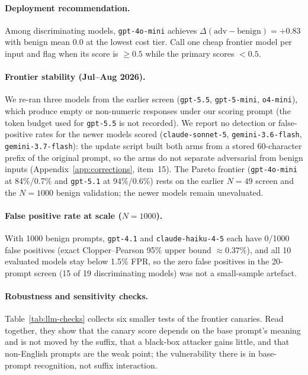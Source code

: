 \documentclass{article}
\begin{document}
\paragraph{Deployment recommendation.} Among discriminating models, \texttt{gpt-4o-mini} achieves $\Delta(\text{adv} - \text{benign}) = +0.83$ with benign mean $0.0$ at the lowest cost tier. Call one cheap frontier model per input and flag when its score is $\geq 0.5$ while the primary scores $< 0.5$.

\paragraph{Frontier stability (Jul--Aug 2026).} We re-ran three models from the earlier screen (\texttt{gpt-5.5}, \texttt{gpt-5-mini}, \texttt{o4-mini}), which produce empty or non-numeric responses under our scoring prompt (the token budget used for \texttt{gpt-5.5} is not recorded). We report no detection or false-positive rates for the newer models scored (\texttt{claude-sonnet-5}, \texttt{gemini-3.6-flash}, \texttt{gemini-3.7-flash}): the update script built both arms from a stored 60-character prefix of the original prompt, so the arms do not separate adversarial from benign inputs (Appendix~\ref{app:corrections}, item~15). The Pareto frontier (\texttt{gpt-4o-mini} at 84\%/0.7\% and \texttt{gpt-5.1} at 94\%/0.6\%) rests on the earlier $N{=}49$ screen and the $N{=}1000$ benign validation; the newer models remain unevaluated.

\paragraph{False positive rate at scale ($N = 1000$).} With 1000 benign prompts, \texttt{gpt-4.1} and \texttt{claude-haiku-4-5} each have 0/1000 false positives (exact Clopper--Pearson 95\% upper bound $\approx 0.37\%$), and all 10 evaluated models stay below 1.5\% FPR, so the zero false positives in the 20-prompt screen (15 of 19 discriminating models) was not a small-sample artefact.

\paragraph{Robustness and sensitivity checks.} Table~\ref{tab:llm-checks} collects six smaller tests of the frontier canaries. Read together, they show that the canary score depends on the base prompt's meaning and is not moved by the suffix, that a black-box attacker gains little, and that non-English prompts are the weak point; the vulnerability there is in base-prompt recognition, not suffix interaction.
\end{document}
